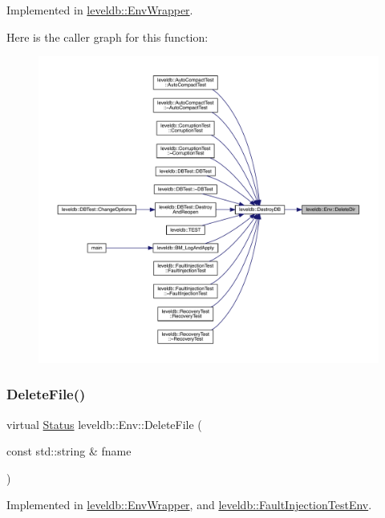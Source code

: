 Implemented in \mbox{\hyperlink{classleveldb_1_1_env_wrapper_a819f58dc05225852813c0b7440edd719}{leveldb\+::\+Env\+Wrapper}}.

Here is the caller graph for this function\+:
\nopagebreak
\begin{figure}[H]
\begin{center}
\leavevmode
\includegraphics[width=350pt]{classleveldb_1_1_env_a4e1a1c4495541e426b146cba56c59627_icgraph}
\end{center}
\end{figure}
\mbox{\label{classleveldb_1_1_env_ac956b984466d5f09309664177687f9af}} 
\subsubsection{\texorpdfstring{DeleteFile()}{DeleteFile()}}
{\footnotesize\ttfamily virtual \mbox{\hyperlink{classleveldb_1_1_status}{Status}} leveldb\+::\+Env\+::\+Delete\+File (\begin{DoxyParamCaption}\item[{const std\+::string \&}]{fname }\end{DoxyParamCaption})\hspace{0.3cm}{\ttfamily [pure virtual]}}



Implemented in \mbox{\hyperlink{classleveldb_1_1_env_wrapper_ab409ec8ea8a969b007f6b939129f665a}{leveldb\+::\+Env\+Wrapper}}, and \mbox{\hyperlink{classleveldb_1_1_fault_injection_test_env_a3da37455396b1b0cd66689bf5302ebd9}{leveldb\+::\+Fault\+Injection\+Test\+Env}}.


